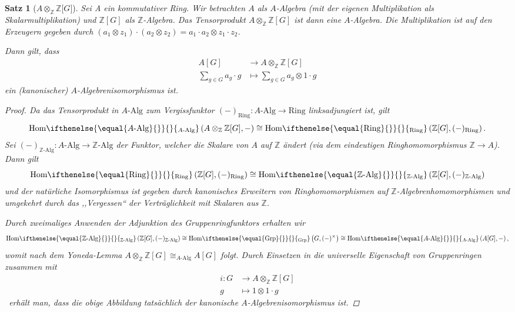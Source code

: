 \documentclass[a4paper,twoside,10pt]{scrreprt}
\newcommand{\Z}{\mathbb{Z}}
\newcommand{\Hom}[2][]{\text{Hom}%
\ifthenelse{\equal{#1}{}}{}{_{#1}}%
\left(#2\right)}%
\newtheorem{satz}{Satz}[section]
\theoremstyle{definition}
\begin{document}
\begin{satz}[$A \otimes_{\Z} \Z{[}G{]}$]\label{satz:ChangeOfCoeffR}
Sei A ein kommutativer Ring. Wir betrachten $A$ als $A$-Algebra (mit der eigenen Multiplikation als Skalarmultiplikation) und $\Z[G]$ als $\Z$-Algebra. Das Tensorprodukt $A\otimes_{\Z}\Z[G]$ ist dann eine $A$-Algebra. Die Multiplikation ist auf den Erzeugern gegeben durch $(a_1\otimes z_1)\cdot(a_2\otimes z_2)=a_1\cdot a_2\otimes z_1\cdot z_2$.\par
Dann gilt, dass
\begin{align*}
A[G]&\to A\otimes_{\Z}\Z[G]\\
\sum\limits_{g\in G}a_g\cdot g&\mapsto \sum\limits_{g\in G}a_g\otimes 1\cdot g
\end{align*}
ein (kanonischer) $A$-Algebrenisomorphismus ist.
\begin{proof}
Da das Tensorprodukt in $A\text{-Alg}$ zum Vergissfunktor $(-)_{\text{Ring}}:A\text{-Alg}\to \text{Ring}$ linksadjungiert ist, gilt
\begin{equation*}
\Hom[A\text{-Alg}]{A\otimes_{\Z}\Z[G],-}\cong\Hom[\text{Ring}]{\Z[G],(-)_{\text{Ring}}}.
\end{equation*}
Sei $(-)_{\Z\text{-Alg}}:A\text{-Alg}\to \Z\text{-Alg}$ der Funktor, welcher die Skalare von $A$ auf $\Z$ ändert (via dem eindeutigen Ringhomomorphismus $\Z\to A$).
Dann gilt 
\begin{equation*}
\Hom[\text{Ring}]{\Z[G],(-)_{\text{Ring}}}\cong\Hom[\Z\text{-Alg}]{\Z[G],(-)_{\Z\text{-Alg}}}
\end{equation*}
und der natürliche Isomorphismus ist gegeben durch kanonisches Erweitern von Ringhomomorphismen auf $\Z$-Algebrenhomomorphismen und umgekehrt durch das ,,Vergessen`` der Verträglichkeit mit Skalaren aus $\Z$.\par
Durch zweimaliges Anwenden der Adjunktion des Gruppenringfunktors erhalten wir
\begin{equation*}
\Hom[\Z\text{-Alg}]{\Z[G],(-)_{\Z\text{-Alg}}}\cong\Hom[\text{Grp}]{G,(-)^{\times}}\cong\Hom[A\text{-Alg}]{A[G],-},
\end{equation*}
womit nach dem Yoneda-Lemma $A\otimes_{\Z} \Z[G]\cong_{A\text{-Alg}}A[G]$ folgt. Durch Einsetzen in die universelle Eigenschaft von Gruppenringen zusammen mit 
\begin{align*}
i:G&\to A\otimes_{\Z}\Z[G]\\
g&\mapsto 1\otimes 1\cdot g
\end{align*}\
erhält man, dass die obige Abbildung tatsächlich der kanonische $A$-Algebrenisomor\-phismus ist.
\end{proof}
\end{satz}
\end{document}
